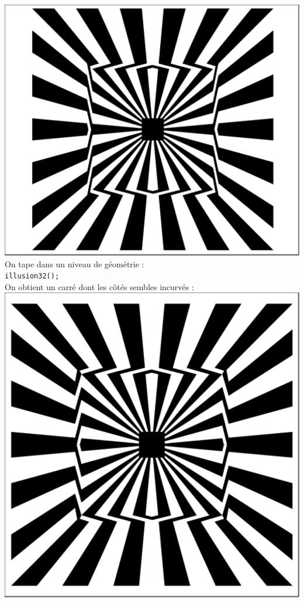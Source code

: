 \documentclass[a4paper,11pt]{book}
\begin{document}
\includegraphics[width=\textwidth]{illusion3}
On tape dans un niveau de g\'eom\'etrie :\\
{\tt illusion32();}\\
On obtient un carr\'e dont les c\^ot\'es sembles incurv\'es :\\
\includegraphics[width=\textwidth]{illusion32}
\end{document}
